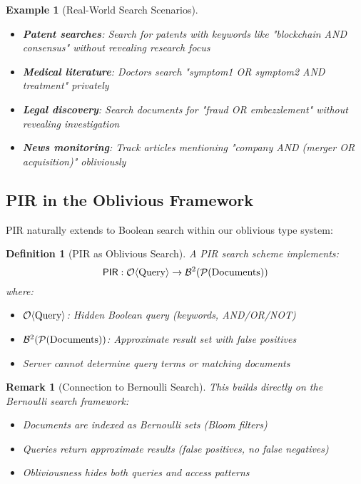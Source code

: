 \documentclass[11pt,final]{article}
\newtheorem{definition}[theorem]{Definition}
\newtheorem{example}[theorem]{Example}
\newtheorem{remark}[theorem]{Remark}
\begin{document}
\begin{example}[Real-World Search Scenarios]
\begin{itemize}
    \item \textbf{Patent searches}: Search for patents with keywords like "blockchain AND consensus" without revealing research focus
    \item \textbf{Medical literature}: Doctors search "symptom1 OR symptom2 AND treatment" privately
    \item \textbf{Legal discovery}: Search documents for "fraud OR embezzlement" without revealing investigation
    \item \textbf{News monitoring}: Track articles mentioning "company AND (merger OR acquisition)" obliviously
\end{itemize}
\end{example}

\subsection{PIR in the Oblivious Framework}

PIR naturally extends to Boolean search within our oblivious type system:

\begin{definition}[PIR as Oblivious Search]
A PIR search scheme implements:
\begin{equation}
\mathsf{PIR}: \Obv{\text{Query}} \to \Bernoulli{\mathcal{P}(\text{Documents})}{2}
\end{equation}
where:
\begin{itemize}
    \item $\Obv{\text{Query}}$: Hidden Boolean query (keywords, AND/OR/NOT)
    \item $\Bernoulli{\mathcal{P}(\text{Documents})}{2}$: Approximate result set with false positives
    \item Server cannot determine query terms or matching documents
\end{itemize}
\end{definition}

\begin{remark}[Connection to Bernoulli Search]
This builds directly on the Bernoulli search framework:
\begin{itemize}
    \item Documents are indexed as Bernoulli sets (Bloom filters)
    \item Queries return approximate results (false positives, no false negatives)
    \item Obliviousness hides both queries and access patterns
\end{itemize}
\end{remark}
\end{document}
